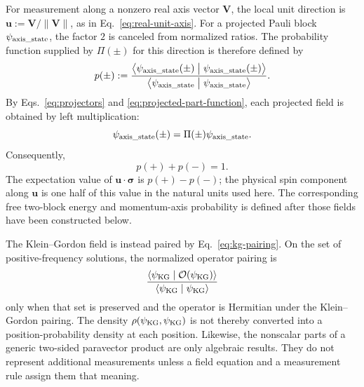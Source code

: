 \documentclass[10pt,letterpaper]{article}
\let\STAamsmathtext\text
\newcommand{\eqtext}[1]{\STAamsmathtext{\normalfont\rmfamily #1}}
\renewcommand{\text}[1]{\STAamsmathtext{\normalfont\rmfamily #1}}
\newcommand{\pv}[1]{#1}
\newcommand{\vct}[1]{\mathbf{#1}}
\newcommand{\sigv}{\vct{\pv{\bm{\sigma}}}}
\begin{document}
For measurement along a nonzero real axis vector \(\vct{V}\), the local unit
direction is \(\vct{u}:=\vct{V}/\|\vct{V}\|\), as in
Eq.\ \eqref{eq:real-unit-axis}. For a projected Pauli block
\(\pv{\psi}_{\eqtext{axis\_state}}\), the factor \(2\) is canceled from
normalized ratios. The
probability function supplied by \(\pv{\Pi}(\pm)\) for this direction is
therefore defined by
\begin{equation}
p(\pm)
:=\frac{
\left\langle
\pv{\psi}_{\eqtext{axis\_state}}(\pm)
\mathrel{\big|}
\pv{\psi}_{\eqtext{axis\_state}}(\pm)
\right\rangle
}{
\left\langle
\pv{\psi}_{\eqtext{axis\_state}}
\mathrel{\big|}
\pv{\psi}_{\eqtext{axis\_state}}
\right\rangle
}.
\label{eq:pauli-projector-probability}
\end{equation}
By Eqs.\ \eqref{eq:projectors} and \eqref{eq:projected-part-function}, each
projected field is obtained by left multiplication:
\[
\pv{\psi}_{\eqtext{axis\_state}}(\pm)
=\pv{\Pi}(\pm)\pv{\psi}_{\eqtext{axis\_state}}.
\]
Consequently,
\begin{equation}
p(+)+p(-)=1.
\label{eq:pauli-probability-sum}
\end{equation}
The expectation value of \(\vct{u}\cdot\sigv\) is \(p(+)-p(-)\); the physical
spin component along \(\vct{u}\) is one half of this value in the natural
units used here. The corresponding free two-block energy and momentum-axis
probability is defined after those fields have been constructed below.

The Klein--Gordon field is instead paired by Eq.\ \eqref{eq:kg-pairing}.
On the set of positive-frequency solutions, the normalized operator pairing
is
\[
\frac{
\langle\psi_{\eqtext{KG}}\mid
\mathcal{O}(\psi_{\eqtext{KG}})\rangle
}{
\langle\psi_{\eqtext{KG}}\mid\psi_{\eqtext{KG}}\rangle
}
\]
only when that set is preserved and the operator is Hermitian under the
Klein--Gordon pairing. The density
\(\rho(\psi_{\eqtext{KG}},\psi_{\eqtext{KG}})\) is not thereby
converted into a position-probability density at each position.
Likewise, the nonscalar parts of a generic two-sided paravector product are
only algebraic results. They do not represent additional measurements unless
a field equation and a measurement rule assign them that meaning.
\end{document}
